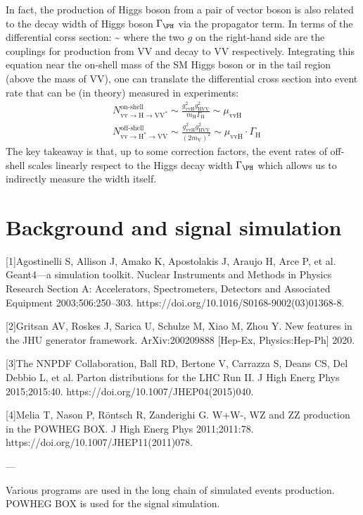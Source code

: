 In fact, the production of Higgs boson from a pair of vector boson is also related to the
decay width of Higgs boson $\Gamma_\text{\PH}$ via the propagator term. In terms of the
differential corss section:
\be
{} 
\sim 
{}
\ee
where the two $g$ on the right-hand side are the couplings for production from VV and decay
to VV respectively. Integrating this equation near the on-shell mass of the SM Higgs boson 
or in the tail region (above the mass of VV), one can translate the differential cross section
into event rate that can be (in theory) measured in experiments:
\begin{equation}
\begin{split}
&N_{\mathrm{vv} \rightarrow \mathrm{H} \rightarrow \mathrm{VV}^{*}}^{\text{on-shell}} \sim \frac{g_{\mathrm{vvH}}^{2} g_{\mathrm{HVV}}^{2}}{m_{\mathrm{H}} \Gamma_{\mathrm{H}}} \sim \mu_{\mathrm{vvH}}
\\
&N_{\mathrm{vv} \rightarrow \mathrm{H}^{*} \rightarrow \mathrm{VV}}^{\text{off-shell}} \sim \frac{g_{\mathrm{vvH}}^{2} g_{\mathrm{HVV}}^{2}}{\left(2 m_{\mathrm{V}}\right)^{2}} \sim \mu_{\mathrm{vvH}} \cdot \Gamma_{\mathrm{H}}
\end{split}
\end{equation}
The key takeaway is that, up to some correction factors, the event rates of off-shell scales
linearly respect to the Higgs decay width $\Gamma_\text{\PH}$ which allows us to indirectly
measure the width itself.
\newpage\phantom{blabla}


\section{Background and signal simulation}
[1]Agostinelli S, Allison J, Amako K, Apostolakis J, Araujo H, Arce P, et al. Geant4—a simulation toolkit. Nuclear Instruments and Methods in Physics Research Section A: Accelerators, Spectrometers, Detectors and Associated Equipment 2003;506:250–303. https://doi.org/10.1016/S0168-9002(03)01368-8.

[2]Gritsan AV, Roskes J, Sarica U, Schulze M, Xiao M, Zhou Y. New features in the JHU generator framework. ArXiv:200209888 [Hep-Ex, Physics:Hep-Ph] 2020.

[3]The NNPDF Collaboration, Ball RD, Bertone V, Carrazza S, Deans CS, Del Debbio L, et al. Parton distributions for the LHC Run II. J High Energ Phys 2015;2015:40. https://doi.org/10.1007/JHEP04(2015)040.

[4]Melia T, Nason P, Röntsch R, Zanderighi G. W+W-, WZ and ZZ production in the POWHEG BOX. J High Energ Phys 2011;2011:78. https://doi.org/10.1007/JHEP11(2011)078.

---


Various programs are used in the long chain of simulated events production.
\textsc{POWHEG BOX}\xspace\cite{POWHEG} is used for the signal simulation.

